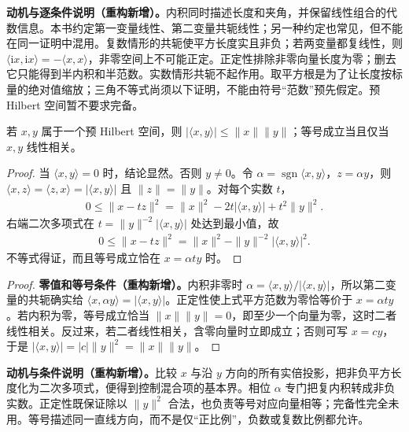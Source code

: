 \documentclass[../../main.tex]{subfiles}
\begin{document}
\begin{remark}
\textbf{动机与逐条件说明（重构新增）。}内积同时描述长度和夹角，并保留线性组合的代数信息。本书约定第一变量线性、第二变量共轭线性；另一种约定也常见，但不能在同一证明中混用。复数情形的共轭使平方长度实且非负；若两变量都复线性，则 $\langle\mathrm ix,\mathrm ix\rangle=-\langle x,x\rangle$，非零空间上不可能正定。正定性排除非零向量长度为零；删去它只能得到半内积和半范数。实数情形共轭不起作用。取平方根是为了让长度按标量的绝对值缩放；三角不等式尚须以下证明，不能由符号“范数”预先假定。预 Hilbert 空间暂不要求完备。
\end{remark}
\begin{theorem}\label{theorem:ch05-schwarz}
若 $x,y$ 属于一个预 Hilbert 空间，则 $|\langle x,y\rangle|\leqslant\|x\|\|y\|$；等号成立当且仅当 $x,y$ 线性相关。
\end{theorem}
\begin{proof}
当 $\langle x,y\rangle=0$ 时，结论显然。否则 $y\ne0$。令 $\alpha=\operatorname{sgn}\langle x,y\rangle$，$z=\alpha y$，则 $\langle x,z\rangle=\langle z,x\rangle=|\langle x,y\rangle|$ 且 $\|z\|=\|y\|$。对每个实数 $t$，
\begin{align*}
0\leqslant\|x-tz\|^2=\|x\|^2-2t|\langle x,y\rangle|+t^2\|y\|^2.
\end{align*}
右端二次多项式在 $t=\|y\|^{-2}|\langle x,y\rangle|$ 处达到最小值，故
\begin{align*}
0\leqslant\|x-tz\|^2=\|x\|^2-\|y\|^{-2}|\langle x,y\rangle|^2.
\end{align*}
不等式得证，而且等号成立恰在 $x=\alpha ty$ 时。
\end{proof}
\begin{proof}
\textbf{零值和等号条件（重构新增）。}内积非零时 $\alpha=\langle x,y\rangle/|\langle x,y\rangle|$，所以第二变量的共轭确实给 $\langle x,\alpha y\rangle=|\langle x,y\rangle|$。正定性使上式平方范数为零恰等价于 $x=\alpha ty$。若内积为零，等号成立恰当 $\|x\|\|y\|=0$，即至少一个向量为零，这时二者线性相关。反过来，若二者线性相关，含零向量时立即成立；否则可写 $x=cy$，于是 $|\langle x,y\rangle|=|c|\|y\|^2=\|x\|\|y\|$。
\end{proof}
\begin{remark}
\textbf{动机与条件说明（重构新增）。}比较 $x$ 与沿 $y$ 方向的所有实倍投影，把非负平方长度化为二次多项式，便得到控制混合项的基本界。相位 $\alpha$ 专门把复内积转成非负实数。正定性既保证除以 $\|y\|^2$ 合法，也负责等号对应向量相等；完备性完全未用。等号描述同一直线方向，而不是仅“正比例”，负数或复数比例都允许。
\end{remark}
\end{document}
